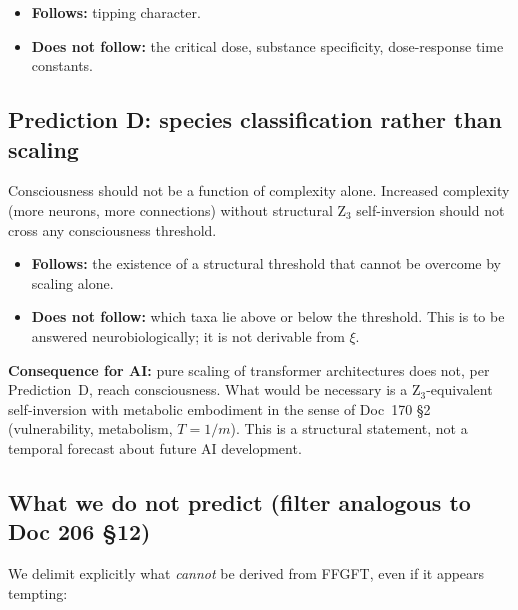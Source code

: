 \begin{itemize}
\item \textbf{Follows:} tipping character.
\item \textbf{Does not follow:} the critical dose, substance specificity, dose-response time constants.
\end{itemize}

\subsection{Prediction D: species classification rather than scaling}\label{sec:predictionD}

Consciousness should not be a function of complexity alone. Increased complexity (more neurons, more connections) without structural Z$_3$ self-inversion should not cross any consciousness threshold.

\begin{itemize}
\item \textbf{Follows:} the existence of a structural threshold that cannot be overcome by scaling alone.
\item \textbf{Does not follow:} which taxa lie above or below the threshold. This is to be answered neurobiologically; it is not derivable from $\xi$.
\end{itemize}

\textbf{Consequence for AI:} pure scaling of transformer architectures does not, per Prediction~D, reach consciousness. What would be necessary is a Z$_3$-equivalent self-inversion with metabolic embodiment in the sense of Doc~170 \S2 (vulnerability, metabolism, $T = 1/m$). This is a structural statement, not a temporal forecast about future AI development.

\subsection{What we do not predict (filter analogous to Doc 206 \S12)}\label{sec:predictions_filter}

We delimit explicitly what \emph{cannot} be derived from FFGFT, even if it appears tempting:

